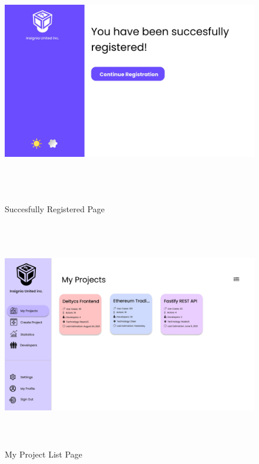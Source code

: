 \begin{figure}[H]
\includegraphics[height=10cm, width=1\textwidth]{./images/prototype/0008}
\centering 
\caption{Succesfully Registered Page}
\label{fig:prototype1}

\includegraphics[height=10cm, width=1\textwidth]{./images/prototype/0003}
\centering 
\caption{My Project List Page}
\label{fig:prototype1}
\end{figure}

